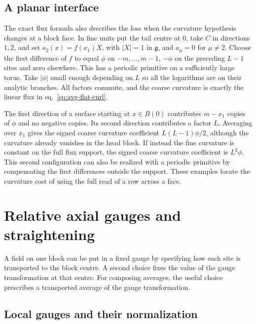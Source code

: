 \documentclass[11pt,letterpaper,reqno]{amsart}
\numberwithin{equation}{section}
\renewcommand{\eqref}[1]{\textup{eq.~\ref{#1}}}
\theoremstyle{definition}
\theoremstyle{remark}
\begin{document}
\subsection{A planar interface}

The exact flux formula also describes the loss when the curvature
hypothesis changes at a block face. In fine units put the tail
centre at \(0\), take \(C\) in directions \(1,2\), and set
\(a_2(x)=f(x_1)X\), with \(|X|=1\) in \(\mathfrak g\), and
\(a_\mu=0\) for \(\mu\ne2\). Choose the first difference of \(f\)
to equal \(\phi\) on \(-m,\ldots,m-1\), \(-\phi\) on the preceding
\(L-1\) sites and zero elsewhere. This has a periodic primitive
on a sufficiently large torus. Take \(|\phi|\) small enough
depending on \(L\) so all the logarithms are on their analytic
branches. All factors commute, and the coarse curvature is
exactly the linear flux in \eqref{eq:avg-flat-curl}.

The first direction of a surface starting at \(x\in B(0)\)
contributes \(m-x_1\) copies of \(\phi\) and no negative copies.
Its second direction contributes a factor \(L\). Averaging
over \(x_1\) gives the signed coarse curvature coefficient \(L(L-1)\phi/2\), although
the curvature already vanishes in the head block. If instead
the fine curvature is constant on the full flux support,
the signed coarse curvature coefficient is \(L^2\phi\). This second configuration can
also be realized with a periodic primitive by compensating the
first differences outside the support. These examples locate
the curvature cost of using the full read of a row across a face.

\section{Relative axial gauges and straightening}\label{sec:gauge-straightening}

A field on one block can be put in a fixed gauge by specifying how each
site is transported to the block centre. A second choice fixes the value of
the gauge transformation at that centre. For composing averages, the
useful choice prescribes a transported average of the gauge transformation.

\subsection{Local gauges and their normalization}
\end{document}
